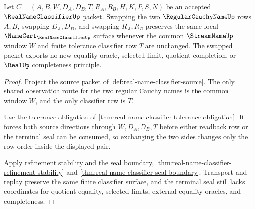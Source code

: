 \begin{theorem}
\label{thm:real-name-classifier-common-window-symmetry}
Let $C=(A,B,W,D_A,D_B,T,R_A,R_B,H,K,P,S,N)$ be an accepted $\RealNameClassifierUp$ packet. Swapping the two $\RegularCauchyNameUp$ rows $A,B$, swapping $D_A,D_B$, and swapping $R_A,R_B$ preserves the same local $\NameCert_{\RealNameClassifierUp}$ surface whenever the common $\StreamNameUp$ window $W$ and finite tolerance classifier row $T$ are unchanged. The swapped packet exports no new equality oracle, selected limit, quotient completion, or $\RealUp$ completeness principle.
\end{theorem}
\begin{proof}
Project the source packet of \autoref{def:real-name-classifier-source}. The only shared observation route for the two regular Cauchy names is the common window $W$, and the only classifier row is $T$.

Use the tolerance obligation of \autoref{thm:real-name-classifier-tolerance-obligation}. It forces both source directions through $W,D_A,D_B,T$ before either readback row or the terminal seal can be consumed, so exchanging the two sides changes only the row order inside the displayed pair.

Apply refinement stability and the seal boundary, \autoref{thm:real-name-classifier-refinement-stability} and \autoref{thm:real-name-classifier-seal-boundary}. Transport and replay preserve the same finite classifier surface, and the terminal seal still lacks coordinates for quotient equality, selected limits, external equality oracles, and completeness.
\end{proof}


